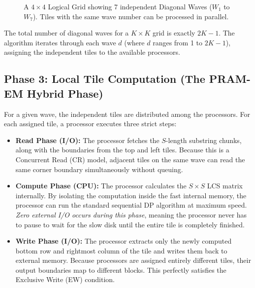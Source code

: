 \begin{figure}[h!]
    \centering
    \caption{A $4 \times 4$ Logical Grid showing 7 independent Diagonal Waves ($W_1$ to $W_7$). Tiles with the same wave number can be processed in parallel.}
    \label{fig:wavefront_grid}
\end{figure}

The total number of diagonal waves for a $K \times K$ grid is exactly $2K - 1$. The algorithm iterates through each wave $d$ (where $d$ ranges from 1 to $2K - 1$), assigning the independent tiles to the available processors. 

\subsection{Phase 3: Local Tile Computation (The PRAM-EM Hybrid Phase)}
For a given wave, the independent tiles are distributed among the processors. For each assigned tile, a processor executes three strict steps:

\begin{itemize}
    \item \textbf{Read Phase (I/O):} The processor fetches the $S$-length substring chunks, along with the boundaries from the top and left tiles. Because this is a Concurrent Read (CR) model, adjacent tiles on the same wave can read the same corner boundary simultaneously without queuing.
    
    \item \textbf{Compute Phase (CPU):} The processor calculates the $S \times S$ LCS matrix internally. By isolating the computation inside the fast internal memory, the processor can run the standard sequential DP algorithm at maximum speed. \textit{Zero external I/O occurs during this phase}, meaning the processor never has to pause to wait for the slow disk until the entire tile is completely finished.
    
    \item \textbf{Write Phase (I/O):} The processor extracts only the newly computed bottom row and rightmost column of the tile and writes them back to external memory. Because processors are assigned entirely different tiles, their output boundaries map to different blocks. This perfectly satisfies the Exclusive Write (EW) condition.
\end{itemize}

